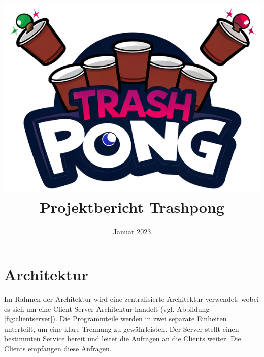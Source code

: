 \documentclass[
]{article}
\title{\includegraphics{resources/header.png} Projektbericht Trashpong}
\author{}
\date{Januar 2023}
\begin{document}
\maketitle

\hypertarget{section-introduction-and-goals}{%
\section{Architektur}\label{section-introduction-and-goals}}

Im Rahmen der Architektur wird eine zentralisierte Architektur verwendet, wobei es sich um eine Client-Server-Architektur handelt (vgl. Abbildung \ref{fig:clientserver}).
Die Programmteile werden in zwei separate Einheiten unterteilt, um eine klare Trennung zu gewährleisten. Der Server stellt einen bestimmten Service bereit und leitet die Anfragen an die Clients weiter. Die Clients empfangen diese Anfragen.\cite{tanenbaum2007distributed}
\end{document}
